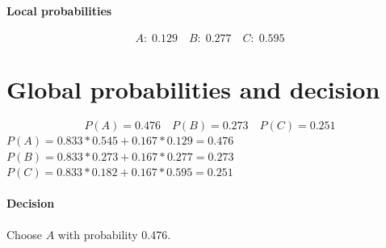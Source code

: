 \paragraph{Local probabilities}
\[A:\; 0.129\quad B:\; 0.277\quad C:\; 0.595\]
\section*{Global probabilities and decision}
\[P(A) = 0.476\quad P(B) = 0.273\quad P(C) = 0.251\]
\(P(A) = 0.833*0.545 + 0.167*0.129 = 0.476\) \\ \(P(B) = 0.833*0.273 + 0.167*0.277 = 0.273\) \\ \(P(C) = 0.833*0.182 + 0.167*0.595 = 0.251\)
\paragraph{Decision} Choose \(A\) with probability 0.476.

